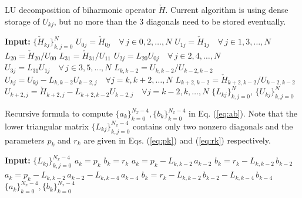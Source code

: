 \documentclass[11pt, oneside]{article}
\newcommand{\N}[1]{\check{#1}}
\begin{document}
\begin{algorithm}
	\caption{LU decomposition of biharmonic operator $\N{H}$. Current algorithm 
	is using dense storage of $U_{kj}$, but no more than the 3 diagonals need 
	to be stored eventually.}
	\label{alg:lu_biharmonic}
	\begin{algorithmic}[1]
			\State \textbf{Input:} $\{\N{H}_{kj}\}_{k, j = 0}^{N}$
	        \State $U_{0j} = \N{H}_{0j} \quad \forall \, j \in 0, 2, \ldots, N$
	        \State $U_{1j} = \N{H}_{1j} \quad \forall \, j \in 1, 3, \ldots, N$
	        \State $L_{20} = \N{H}_{20}/U_{00}$
	        \State $L_{31} = \N{H}_{31}/U_{11}$
	        \State $U_{2j} = L_{20} U_{0j} \quad \forall \, j \in 2, 4, \ldots, 
	        N$
	        \State $U_{3j} = L_{31} U_{1j} \quad \forall \, j \in 3, 5, \ldots, 
	        N$
	            \State $L_{k,k-2} = {U}_{k,k-2}/{U}_{k-2, k-2}$
		        \State $U_{kj} = {U}_{kj} - L_{k, k-2} U_{k-2, j} \quad 
		        \forall j = k, k+2, \ldots, N$
		        \State $L_{k+2,k-2} = \N{H}_{k+2, k-2} / U_{k-2, k-2}$
		        \State $U_{k+2,j} = \N{H}_{k+2,j} - L_{k+2, k-2} U_{k-2, j} 
		        \quad \forall j = k-2, k, \ldots, N$
		        \EndIf
	        \EndFor
	        \State \Return $\{L_{kj}\}_{k, j = 0}^{N}$, $\{U_{kj}\}_{k, j = 
	        0}^{N}$
		\EndProcedure	
	\end{algorithmic}
\end{algorithm}		

\begin{algorithm}
	\caption{Recursive formula to compute $\{a_k\}_{k=0}^{N_x-4}, 
	\{b_k\}_{k=0}^{N_x-4}$ in Eq. (\ref{eq:ab}). Note that the lower triangular 
	matrix $\{L_{kj}\}_{k,j=0}^{N_x-4}$ contains only two nonzero diagonals and 
	the parameters $p_k$ and $r_k$ are given in Eqs. (\ref{eq:pk}) and 
	(\ref{eq:rk}) respectively. }
    \label{alg:ab}
	\begin{algorithmic}[1]
		\State \textbf{Input:} $ \{L_{kj}\}_{k,j=0}^{N_x-4}$
		     \State $a_k = p_k$
		     \State $b_k = r_k$
		\EndFor
		    \State $a_k = p_k - L_{k,k-2}\,a_{k-2}$
		    \State $b_k = r_k - L_{k, k-2}\,b_{k-2}$
		\EndFor
     		\State $a_k = p_k - L_{k,k-2}\,a_{k-2} - L_{k, k-4} \,a_{k-4}$
	    	\State $b_k = r_k - L_{k, k-2}\,b_{k-2}- L_{k, k-4} \,b_{k-4}$
		\EndFor
		\State \Return $\{a_k\}_{k=0}^{N_x-4}, \{b_k\}_{k=0}^{N_x-4}$
        \EndProcedure
\end{algorithmic}
\end{algorithm}
\end{document}
